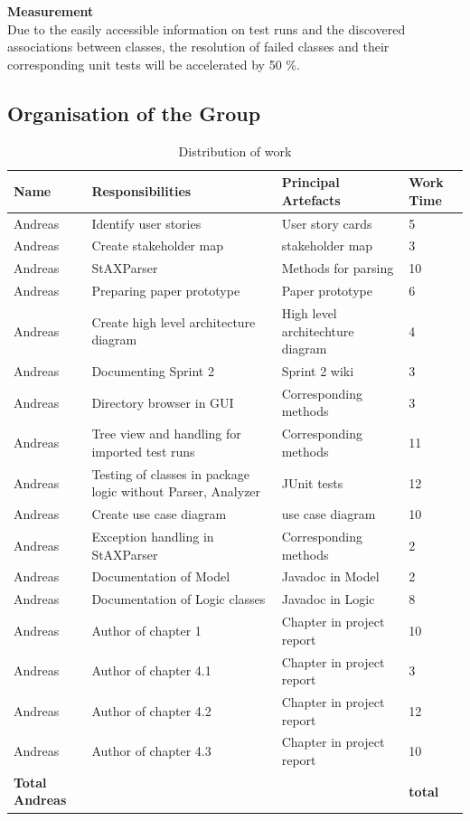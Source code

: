 \large\textbf{Measurement}\\ 
Due to the easily accessible information on test runs and the discovered associations between classes, the resolution of failed classes and their corresponding unit tests will be accelerated by 50 \%. 

\newpage
\subsection{Organisation of the Group}

\begin{table}[!h]
  \caption{Distribution of work}
  \centering
  \begin{tabular}{p{2cm}||p{4.2cm}|p{4cm}|l|}
    Name & Responsibilities & Principal Artefacts & Work Time\\
    \hline
    \hline
    Andreas & Identify user stories & User story cards & 5 \\
    \hline
    Andreas & Create stakeholder map & stakeholder map & 3 \\ 
    \hline
    Andreas & StAXParser & Methods for parsing & 10 \\ 
    \hline
    Andreas & Preparing paper prototype & Paper prototype & 6 \\
    \hline
    Andreas & Create high level architecture diagram & High level architechture diagram & 4 \\ 
    \hline
    Andreas & Documenting Sprint 2 & Sprint 2 wiki & 3 \\ 
    \hline 
    Andreas & Directory browser in GUI & Corresponding methods & 3 \\ 
    \hline
    Andreas & Tree view and handling for imported test runs & Corresponding methods & 11 \\ 
    \hline
    Andreas & Testing of classes in package logic without Parser, Analyzer & JUnit tests & 12 \\ 
    \hline 
    Andreas & Create use case diagram & use case diagram & 10 \\ 
    \hline
    Andreas & Exception handling in StAXParser & Corresponding methods & 2 \\ 
    \hline
    Andreas & Documentation of Model & Javadoc in Model & 2 \\ 
    \hline
    Andreas & Documentation of Logic classes & Javadoc in Logic & 8 \\ 
    \hline
    Andreas & Author of chapter 1 & Chapter in project report & 10 \\ 
    \hline
    Andreas & Author of chapter 4.1 & Chapter in project report & 3 \\ 
    \hline
    Andreas & Author of chapter 4.2 & Chapter in project report & 12 \\
    \hline 
    Andreas & Author of chapter 4.3 & Chapter in project report & 10 \\ 
    \hline
    \hline 
    \textbf{Total \newline Andreas} & & & \textbf{total}   \\
    \hline
    \hline
  \end{tabular}
\end{table}

